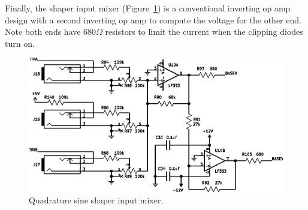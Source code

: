 Finally, the shaper input mixer (Figure~\ref{fig:sh-inmix}) is a
conventional inverting op amp design with a second inverting op amp to
compute the voltage for the other end.  Note both ends have 680$\Omega$
resistors to limit the current when the clipping diodes turn on.

\begin{figure}
\centering\includegraphics{sh-inmix}\par
\caption{Quadrature sine shaper input mixer.}\label{fig:sh-inmix}
\end{figure}
